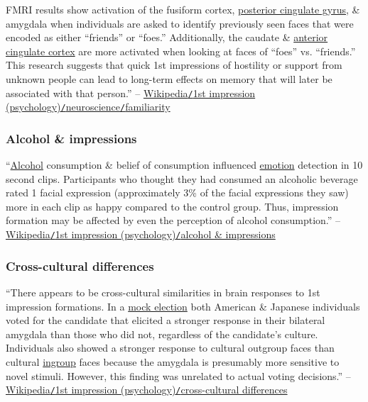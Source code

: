 \documentclass[oneside]{book}
\numberwithin{equation}{section}
\begin{document}
FMRI results show activation of the fusiform cortex, \href{https://en.wikipedia.org/wiki/Posterior_cingulate_gyrus}{posterior cingulate gyrus}, \& amygdala when individuals are asked to identify previously seen faces that were encoded as either ``friends'' or ``foes.'' Additionally, the caudate \& \href{https://en.wikipedia.org/wiki/Anterior_cingulate_cortex}{anterior cingulate cortex} are more activated when looking at faces of ``foes'' vs. ``friends.'' This research suggests that quick 1st impressions of hostility or support from unknown people can lead to long-term effects on memory that will later be associated with that person.'' -- \href{https://en.wikipedia.org/wiki/First_impression_(psychology)#Familiarity}{Wikipedia\texttt{/}1st impression (psychology)\texttt{/}neuroscience\texttt{/}familiarity}

\subsubsection{Alcohol \& impressions}
``\href{https://en.wikipedia.org/wiki/Alcohol_(drug)}{Alcohol} consumption \& belief of consumption influenced \href{https://en.wikipedia.org/wiki/Emotion}{emotion} detection in 10 second clips. Participants who thought they had consumed an alcoholic beverage rated 1 facial expression (approximately 3\% of the facial expressions they saw) more in each clip as happy compared to the control group. Thus, impression formation may be affected by even the perception of alcohol consumption.'' -- \href{https://en.wikipedia.org/wiki/First_impression_(psychology)#Alcohol_and_Impressions}{Wikipedia\texttt{/}1st impression (psychology)\texttt{/}alcohol \& impressions}

\subsubsection{Cross-cultural differences}
``There appears to be cross-cultural similarities in brain responses to 1st impression formations. In a \href{https://en.wikipedia.org/wiki/Mock_election}{mock election} both American \& Japanese individuals voted for the candidate that elicited a stronger response in their bilateral amygdala than those who did not, regardless of the candidate's culture. Individuals also showed a stronger response to cultural outgroup faces than cultural \href{https://en.wikipedia.org/wiki/Ingroup}{ingroup} faces because the amygdala is presumably more sensitive to novel stimuli. However, this finding was unrelated to actual voting decisions.'' -- \href{https://en.wikipedia.org/wiki/First_impression_(psychology)#Cross-cultural_differences}{Wikipedia\texttt{/}1st impression (psychology)\texttt{/}cross-cultural differences}
\end{document}

